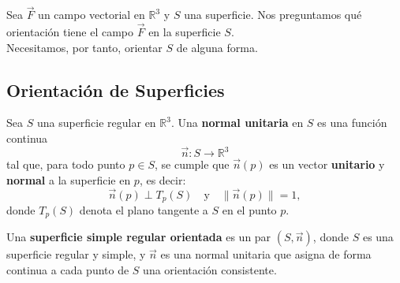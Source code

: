 Sea $\vec{F}$ un campo vectorial en $\mathbb{R}^3$ y $S$ una superficie. Nos
preguntamos qué orientación tiene el campo $\vec{F}$ en la superficie $S$.\\
Necesitamos, por tanto, orientar $S$ de alguna forma.

\subsection{Orientación de Superficies}

\begin{definición} 
Sea \( S \) una superficie regular en \( \mathbb{R}^3 \). Una \textbf{normal unitaria} en \( S \) es una función continua
\[
    \vec{n}: S \to \mathbb{R}^3
\]
tal que, para todo punto \( p \in S \), se cumple que \( \vec{n}(p) \) es un
vector \textbf{unitario} y \textbf{normal} a la superficie en \( p \), es
decir:
\[
    \vec{n}(p) \perp T_p(S) \quad \text{y} \quad \|\vec{n}(p)\| = 1,
\]
donde \( T_p(S) \) denota el plano tangente a \( S \) en el punto \( p \).
\end{definición}

\begin{definición} 
Una \textbf{superficie simple regular orientada} es un par \( (S, \vec{n}) \), donde \( S \) es una superficie regular y simple, y \( \vec{n} \) es una normal unitaria que asigna de forma continua a cada punto de \( S \) una orientación consistente.
\end{definición}

